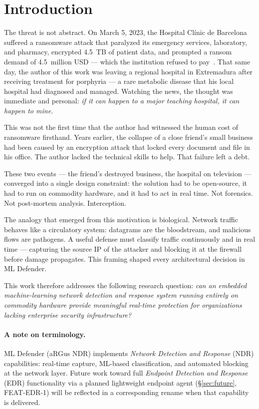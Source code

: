 \documentclass[11pt,a4paper]{article}
\begin{document}
    \section{Introduction}

    The threat is not abstract. On March 5, 2023, the Hospital Cl\'inic de Barcelona suffered a
    ransomware attack that paralyzed its emergency services, laboratory, and pharmacy, encrypted
    4.5~TB of patient data, and prompted a ransom demand of 4.5~million USD --- which the
    institution refused to pay~\cite{incibe2023}. That same day, the author of this work was
    leaving a regional hospital in Extremadura after receiving treatment for porphyria --- a rare
    metabolic disease that his local hospital had diagnosed and managed. Watching the news, the
    thought was immediate and personal: \emph{if it can happen to a major teaching hospital, it
    can happen to mine.}

    This was not the first time that the author had witnessed the human cost of ransomware
    firsthand. Years earlier, the collapse of a close friend's small business had been caused by
    an encryption attack that locked every document and file in his office. The author lacked the
    technical skills to help. That failure left a debt.

    These two events --- the friend's destroyed business, the hospital on television ---
    converged into a single design constraint: the solution had to be open-source, it had to run
    on commodity hardware, and it had to act in real time. Not forensics. Not post-mortem
    analysis. Interception.

    The analogy that emerged from this motivation is biological. Network traffic behaves like a
    circulatory system: datagrams are the bloodstream, and malicious flows are pathogens. A
    useful defense must classify traffic continuously and in real time --- capturing the source IP
    of the attacker and blocking it at the firewall before damage propagates. This framing shaped
    every architectural decision in ML Defender.

    This work therefore addresses the following research question: \emph{can an embedded
    machine-learning network detection and response system running entirely on commodity hardware
    provide meaningful real-time protection for organizations lacking enterprise security
    infrastructure?}

    \paragraph{A note on terminology.}
    ML Defender (aRGus NDR) implements \emph{Network Detection and Response} (NDR) capabilities:
    real-time capture, ML-based classification, and automated blocking at the network layer.
    Future work toward full \emph{Endpoint Detection and Response} (EDR) functionality via a
    planned lightweight endpoint agent (\S\ref{sec:future}, FEAT-EDR-1) will be reflected in a
    corresponding rename when that capability is delivered.
\end{document}
